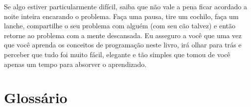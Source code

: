 Se algo estiver particularmente difícil, saiba que não vale a pena ficar acordado
a noite inteira encarando o problema. Faça uma pausa, tire um cochilo, faça um lanche,
compartilhe o seu problema com alguém (com seu cão talvez) e então retorne ao
problema com a mente descansada. Eu asseguro a você que uma vez que você aprenda
os conceitos de programação neste livro, irá olhar para trás e perceber que tudo foi
muito fácil, elegante e tão simples que tomou de você apenas um tempo para absorver
o aprendizado.
%

\section{Glossário}
%

